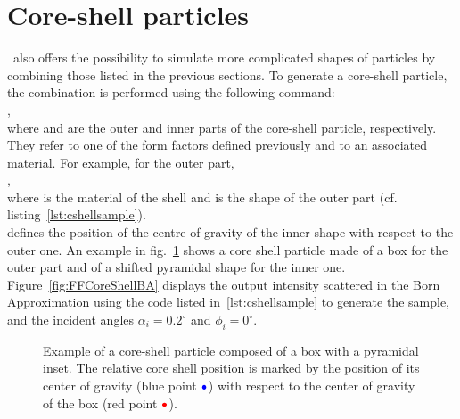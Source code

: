 \section{Core-shell particles}
 \BornAgain\ also offers the possibility to simulate more complicated shapes of particles by combining those listed in the previous sections. To generate a core-shell particle, the combination is performed using the following command:\\
,\\
where  and  are the outer and inner parts of the core-shell particle, respectively. They refer to one of the form factors defined previously and to an associated material. For example, for the outer part,\\ ,\\ where  is the material of the shell and  is the shape of the outer part (cf. listing~\ref{lst:cshellsample}). \\  defines the position of the centre of gravity of the inner shape with respect to the outer one. An example in fig.~\ref{fig:coreshell} shows a core shell particle made of a box for the outer part and of a shifted pyramidal shape for the inner one.\\

Figure~\ref{fig:FFCoreShellBA} displays the output intensity scattered in the Born Approximation using the code listed in~\ref{lst:cshellsample} to generate the sample, and the incident angles $\alpha_i= 0.2^{\circ}$ and $\phi_i=0^{\circ}$. 

\begin{figure}[ht]
\hfill
{}
\hfill
{}
\hfill
\caption{Example of a core-shell particle composed of a box with a pyramidal  inset. The relative core shell position is marked by the position of its center of gravity (blue point $\color{blue}\bullet$) with respect to the center of gravity of the box (red point $\color{red}\bullet$). }
\label{fig:coreshell}
\end{figure}

